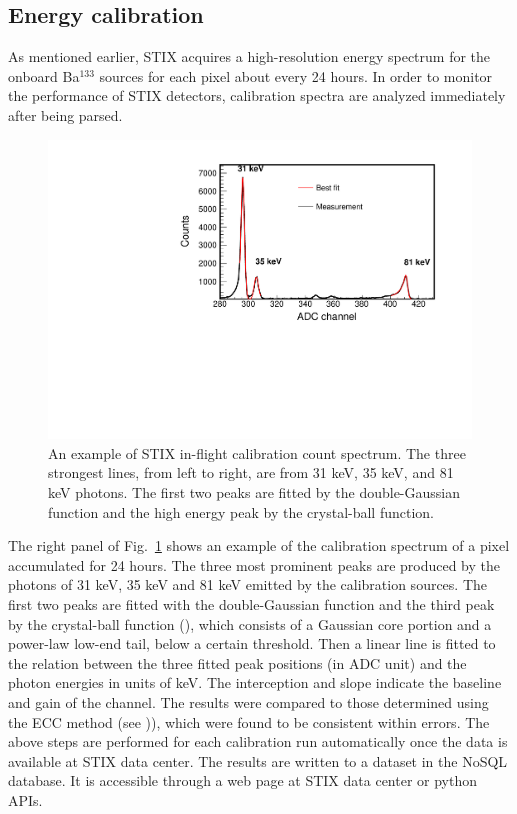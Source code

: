 \documentclass[referee]{aa} %
\begin{document}
\subsection{Energy calibration}
As mentioned earlier, STIX acquires a high-resolution energy spectrum
for the onboard Ba$^{133}$ sources for each pixel about every 24 hours. 
In order to monitor the performance of STIX detectors, 
calibration spectra are analyzed immediately after being parsed.
\begin{figure}
 \centering
  \includegraphics[width=0.8\linewidth]{figures/cal-fit.pdf}
  \caption{An example of STIX in-flight calibration count spectrum.
  The three strongest lines, from left to right, are from 31 keV, 35 keV, and 81 keV
  photons. The first two peaks are fitted by the double-Gaussian function and the high energy peak by  
  the crystal-ball function. }
    \label{fig:cal-fit}
\end{figure}
The right panel of Fig.~\ref{fig:cal-fit} shows an example of the calibration spectrum of a pixel accumulated for 24 hours.  
The three most prominent peaks are produced by the photons of  31 keV, 35 keV and 81 keV emitted by the calibration sources. 
The first two peaks are fitted with the double-Gaussian function and the third peak
by the crystal-ball function (\cite{crsystallball}),  which consists of a Gaussian core portion 
and a power-law low-end tail, below a certain threshold.
Then a linear line is fitted to the relation between
the three fitted peak positions (in ADC unit) and the photon energies in units of keV.  
The interception and slope indicate the baseline and gain of the channel. 
The results were compared to those determined using the ECC method (see \cite{ecc,ecc2})), 
 which were found to be consistent within errors.
The above steps are performed for each calibration run automatically 
once the data is available at STIX data center.  The results are written to a
 dataset in the NoSQL database.  It is accessible through a web page at STIX data center or python APIs.
\end{document}
